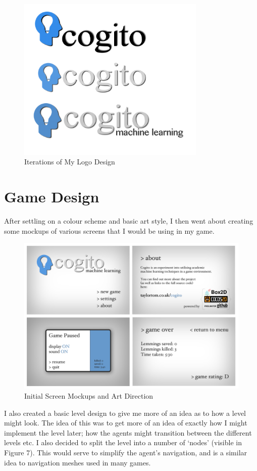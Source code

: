 \documentclass[a4paper,oneside]{report}
\begin{document}
\begin{figure}[h!]
  \centering
    \includegraphics[width=90mm]{sources/images/cogito_logo1}
    \caption{Iterations of My Logo Design}
\end{figure}

\section{Game Design}

After settling on a colour scheme and basic art style, I then went about creating some mockups of various screens that I would be using in my game.
	
\begin{figure}[h!]
  \centering
    \includegraphics[width=140mm]{sources/images/Screens}
    \caption{Initial Screen Mockups and Art Direction}
\end{figure}

I also created a basic level design to give me more of an idea as to how a level might look. The idea of this was to get more of an idea of exactly how I might implement the level later; how the agents might transition between the different levels etc. I also decided to split the level into a number of `nodes' (visible in Figure 7). This would serve to simplify the agent's navigation, and is a similar idea to navigation meshes used in many games.  
\end{document}

